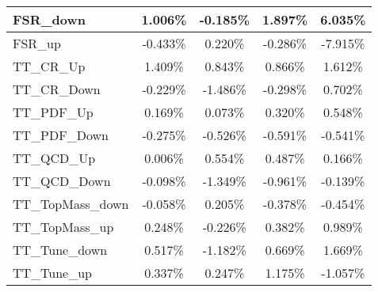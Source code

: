 \begin{table}[]
{\begin{tabular}{|l|c|c|c|c|}
FSR\_down                                & 1.006\%                                   & -0.185\%                                  & 1.897\%                                 & 6.035\%                                  \\ \hline
FSR\_up                                  & -0.433\%                                     & 0.220\%                                    & -0.286\%                                   & -7.915\%                                    \\ \hline
TT\_CR\_Up                         & 1.409\%                          & 0.843\%                          & 0.866\%                         & 1.612\%                           \\ \hline
TT\_CR\_Down                       & -0.229\%                        & -1.486\%                        & -0.298\%                       & 0.702\%                           \\ \hline
TT\_PDF\_Up                        & 0.169\%                         & 0.073\%                         & 0.320\%                        & 0.548\%                       \\ \hline
TT\_PDF\_Down                      & -0.275\%                       & -0.526\%                       & -0.591\%                      & -0.541\%                       \\ \hline
TT\_QCD\_Up                        & 0.006\%                         & 0.554\%                         & 0.487\%                        & 0.166\%                       \\ \hline
TT\_QCD\_Down                      & -0.098\%                       & -1.349\%                       & -0.961\%                      & -0.139\%                       \\ \hline
TT\_TopMass\_down                      & -0.058\%                       & 0.205\%                       & -0.378\%                      & -0.454\%                       \\ \hline
TT\_TopMass\_up                      & 0.248\%                       & -0.226\%                       & 0.382\%                      & 0.989\%                       \\ \hline
TT\_Tune\_down            & 0.517\%             & -1.182\%             & 0.669\%            & 1.669\%             \\ \hline
TT\_Tune\_up              & 0.337\%               & 0.247\%               & 1.175\%              & -1.057\%               \\ \hline

\end{tabular}}
\end{table}
